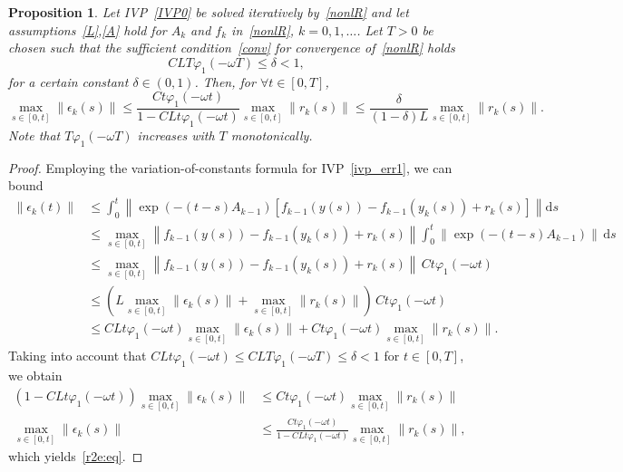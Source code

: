 \documentclass[sn-aps]{sn-jnl}
\theoremstyle{thmstyleone}%
\newtheorem{proposition}[theorem]{Proposition}%
\theoremstyle{thmstyletwo}%
\theoremstyle{thmstylethree}%
\newcommand{\dd}{\mathrm{d}}
\newcommand{\leqs}{\leqslant}
\begin{document}
\begin{proposition}
\label{r2e}
Let IVP~\eqref{IVP0} be solved iteratively by~\eqref{nonlR} and let 
assumptions~\eqref{L},\eqref{A} hold for $A_k$ and $f_k$ in~\eqref{nonlR}, $k=0,1,\dots$.
Let $T>0$ be chosen such that the sufficient condition~\eqref{conv} for 
convergence of~\eqref{nonlR} holds
\begin{equation}
\label{conv1}
C L T\varphi_1(-\omega T) \leqs \delta <1,
\end{equation}
for a certain constant $\delta\in(0,1)$.
Then, for $\forall t\in[0,T]$,
\begin{equation}
\label{r2e:eq}
\max_{s\in[0,t]} \|\epsilon_k(s)\| \leqs 
\frac{C t\varphi_1(-\omega t)}{1-C L t\varphi_1(-\omega t)} \max_{s\in[0,t]}\|r_k(s)\|
\leqs 
\frac{\delta}{(1- \delta)L} \max_{s\in[0,t]}\|r_k(s)\|.
\end{equation}
Note that $T\varphi_1(-\omega T)$ increases with $T$ monotonically.
\end{proposition}

\begin{proof}
Employing the variation-of-constants formula for IVP~\eqref{ivp_err1},
we can bound
\begin{align*}
\|\epsilon_k(t)\| &\leqs 
\int_0^t \left\| \exp(-(t-s)A_{k-1})\left[f_{k-1}(y(s))-f_{k-1}(y_k(s)) + r_k(s)\right] \right\|\dd s
\\&\leqs 
\max_{s\in[0,t]}\left\|f_{k-1}(y(s))-f_{k-1}(y_k(s)) + r_k(s)\right\| \int_0^t \| \exp(-(t-s)A_{k-1})\|\,\dd s  
\\&\leqs 
\max_{s\in[0,t]}\left\|f_{k-1}(y(s))-f_{k-1}(y_k(s)) + r_k(s)\right\| \, C t\varphi_1(-\omega t)
\\&\leqs 
\left( L\max_{s\in[0,t]}\|\epsilon_k(s)\| + \max_{s\in[0,t]}\|r_k(s)\|\right) 
\, C t\varphi_1(-\omega t)
\\&\leqs 
C L t\varphi_1(-\omega t) \max_{s\in[0,t]}\|\epsilon_k(s)\| + 
C t\varphi_1(-\omega t) \max_{s\in[0,t]}\|r_k(s)\|. 
\end{align*}
Taking into account that 
$C L t\varphi_1(-\omega t)\leqs C L T\varphi_1(-\omega T) \leqs \delta <1$
for $t\in[0,T]$, 
we obtain
\begin{align*}
(1-C L t\varphi_1(-\omega t))\max_{s\in[0,t]} \|\epsilon_k(s)\| &\leqs 
C t\varphi_1(-\omega t) \max_{s\in[0,t]}\|r_k(s)\|
\\
\max_{s\in[0,t]} \|\epsilon_k(s)\| &\leqs 
\frac{C t\varphi_1(-\omega t)}{1-C L t\varphi_1(-\omega t)} \max_{s\in[0,t]}\|r_k(s)\|,
\end{align*}
which yields~\eqref{r2e:eq}.
\end{proof}
\end{document}
